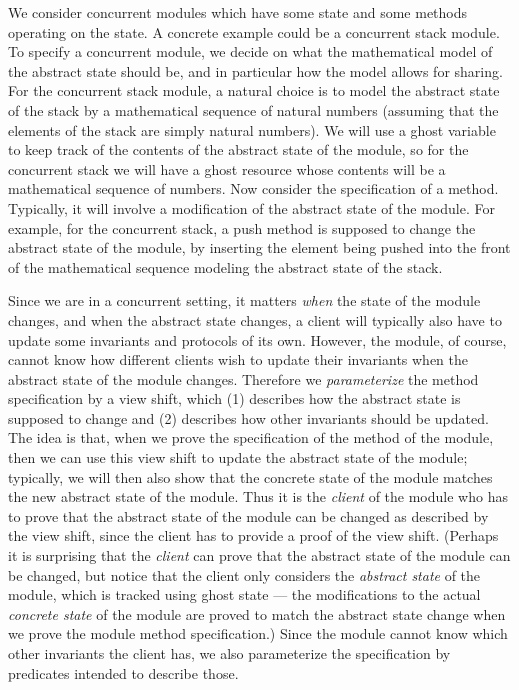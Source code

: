 We consider concurrent modules which have some state and some methods operating on the state.
A concrete example could be a concurrent stack module.
To specify a concurrent module, we decide on what the mathematical model of the abstract state should be, and in particular how the model allows for sharing.
For the concurrent stack module, a natural choice is to model the abstract state of the stack by a mathematical sequence of natural numbers (assuming that the elements of the stack are simply natural numbers). 
We will use a ghost variable to keep track of the contents of the abstract state of the module, so for the concurrent stack we will have a ghost resource whose contents will be a mathematical sequence of numbers.
Now consider the specification of a method. Typically, it will involve a modification of the abstract state of the module.
For example, for the concurrent stack, a push method is supposed to change the abstract state of the module, by inserting the element being pushed into the front of the mathematical sequence modeling the abstract state of the stack.

Since we are in a concurrent setting, it matters \emph{when} the state of the module changes, and when the abstract state changes, a client will typically also have to update some invariants and protocols of its own.
However, the module, of course, cannot know how different clients wish to update their invariants when the abstract state of the module changes.
Therefore we \emph{parameterize} the method specification by a view shift, which (1) describes how the abstract state is supposed to change and (2) describes how other invariants should be updated. 
The idea is that, when we prove the specification of the method of the module, then we can use this view shift to update the abstract state
of the module; typically, we will then also show that the concrete state of the module matches the new abstract state of the module.
Thus it is the \emph{client} of the module who has to prove that the abstract state of the module can be changed as described by the view shift,
since the client has to provide a proof of the view shift. (Perhaps it is surprising that the \emph{client} can prove that the abstract state of
the module can be changed, but notice that the client only considers the \emph{abstract state} of the module, which is tracked using ghost state ---
the modifications to the actual \emph{concrete state} of the module are proved to match the abstract state change when we prove the module method specification.)
Since the module cannot know which other invariants the client has, we also parameterize the specification by predicates intended to describe those. 


